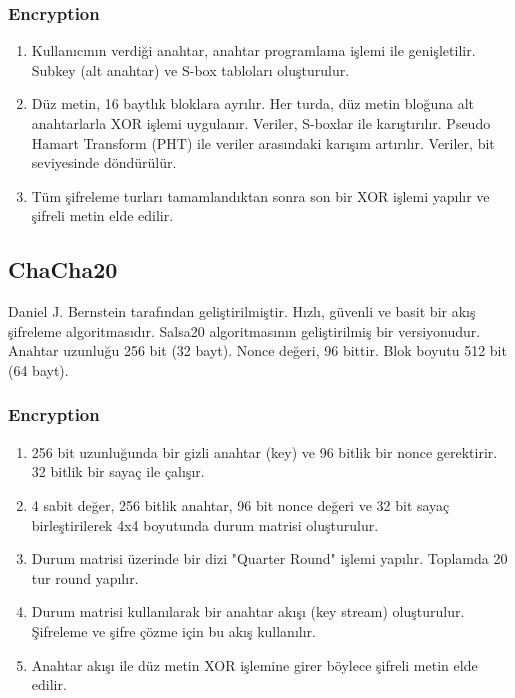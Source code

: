 \subsubsection{Encryption}

\begin{enumerate}
    \item Kullanıcının verdiği anahtar, anahtar programlama işlemi ile genişletilir. Subkey (alt anahtar) ve S-box tabloları oluşturulur.
    \item Düz metin, 16 baytlık bloklara ayrılır. Her turda, düz metin bloğuna alt anahtarlarla XOR işlemi uygulanır. Veriler, S-boxlar ile karıştırılır. Pseudo Hamart Transform (PHT) ile veriler arasındaki karışım artırılır. Veriler, bit seviyesinde döndürülür.
    \item Tüm şifreleme turları tamamlandıktan sonra son bir XOR işlemi yapılır ve şifreli metin elde edilir.
\end{enumerate}

\newpage

\subsection{ChaCha20}

Daniel J. Bernstein tarafından geliştirilmiştir. Hızlı, güvenli ve basit bir akış şifreleme algoritmasıdır. Salsa20 algoritmasının geliştirilmiş bir versiyonudur. Anahtar uzunluğu 256 bit (32 bayt). Nonce değeri, 96 bittir. Blok boyutu 512 bit (64 bayt). 

\subsubsection{Encryption}

\begin{enumerate}
    \item 256 bit uzunluğunda bir gizli anahtar (key) ve 96 bitlik bir nonce gerektirir. 32 bitlik bir sayaç ile çalışır.
    \item 4 sabit değer, 256 bitlik anahtar, 96 bit nonce değeri ve 32 bit sayaç birleştirilerek 4x4 boyutunda durum matrisi oluşturulur.
    \item Durum matrisi üzerinde bir dizi "Quarter Round" işlemi yapılır. Toplamda 20 tur round yapılır.
    \item Durum matrisi kullanılarak bir anahtar akışı (key stream) oluşturulur. Şifreleme ve şifre çözme için bu akış kullanılır.
    \item Anahtar akışı ile düz metin XOR işlemine girer böylece şifreli metin elde edilir. 
\end{enumerate}


